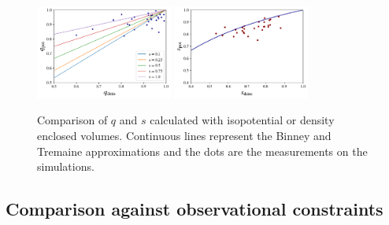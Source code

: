 \documentclass[a4paper,fleqn,usenatbib]{mnras}
\begin{document}
\begin{figure}
\centering
\includegraphics[width=0.4\textwidth]{q_pot_vs_q_den.pdf}
\includegraphics[width=0.4\textwidth]{s_pot_vs_s_den.pdf}
\caption{Comparison of $q$ and $s$ calculated with isopotential or
  density enclosed volumes. 
  Continuous lines represent the Binney and Tremaine approximations
  and the dots are the measurements on the simulations.}
\label{fig:shape_comp} 
\end{figure} 


\subsection{Comparison against observational constraints}
\end{document}
